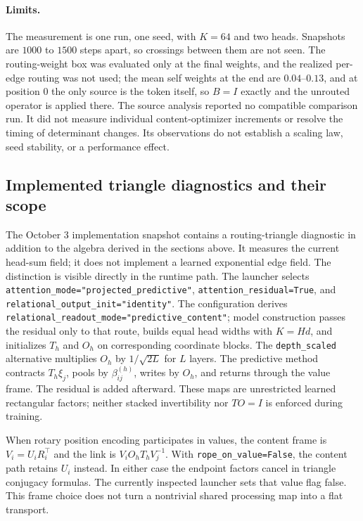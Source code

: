 \documentclass[11pt]{article}
\theoremstyle{definition}
\theoremstyle{remark}
\providecommand{\cfg}[1]{{\small\texttt{#1}}}
\begin{document}
\paragraph{Limits.}
The measurement is one run, one seed, with $K=64$ and two heads. Snapshots are $1000$ to $1500$ steps apart, so crossings between them are not seen. The routing-weight box was evaluated only at the final weights, and the realized per-edge routing was not used; the mean self weights at the end are $0.04$--$0.13$, and at position $0$ the only source is the token itself, so $B=I$ exactly and the unrouted operator is applied there. The source analysis reported no compatible comparison run. It did not measure individual content-optimizer increments or resolve the timing of determinant changes. Its observations do not establish a scaling law, seed stability, or a performance effect.

\subsection{Implemented triangle diagnostics and their scope}
\label{links:sec:diagnostics}

The October 3 implementation snapshot contains a routing-triangle diagnostic in addition to the algebra derived in the sections above. It measures the current head-sum field; it does not implement a learned exponential edge field. The distinction is visible directly in the runtime path. The launcher selects \cfg{attention\_mode="projected\_predictive"}, \cfg{attention\_residual=True}, and \cfg{relational\_output\_init="identity"}. The configuration derives \cfg{relational\_readout\_mode="predictive\_content"}; model construction passes the residual only to that route, builds equal head widths with $K=Hd$, and initializes $T_h$ and $O_h$ on corresponding coordinate blocks. The \cfg{depth\_scaled} alternative multiplies $O_h$ by $1/\sqrt{2L}$ for $L$ layers. The predictive method contracts $T_h\xi_j$, pools by $\beta_{ij}^{(h)}$, writes by $O_h$, and returns through the value frame. The residual is added afterward. These maps are unrestricted learned rectangular factors; neither stacked invertibility nor $TO=I$ is enforced during training.

When rotary position encoding participates in values, the content frame is $V_i=U_iR_i^\top$ and the link is $V_iO_hT_hV_j^{-1}$. With \cfg{rope\_on\_value=False}, the content path retains $U_i$ instead. In either case the endpoint factors cancel in triangle conjugacy formulas. The currently inspected launcher sets that value flag false. This frame choice does not turn a nontrivial shared processing map into a flat transport.
\end{document}
